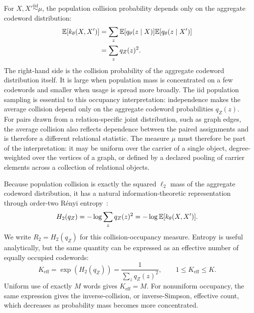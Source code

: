 For $X,X'\overset{\mathrm{iid}}{\sim}\mu$, the population collision probability depends only on the aggregate codeword distribution:
\begin{align}
\mathbb{E}[k_\theta(X,X')]
&=\sum_z\mathbb{E}[q_\theta(z\mid X)]\mathbb{E}[q_\theta(z\mid X')]\\
&=\sum_zq_Z(z)^2.
\label{eq:population-collision}
\end{align}
The right-hand side is the collision probability of the aggregate codeword distribution itself.
It is large when population mass is concentrated on a few codewords and smaller when usage is spread more broadly.
The iid population sampling is essential to this occupancy interpretation: independence makes the average collision depend only on the aggregate codeword probabilities $q_Z(z)$.
For pairs drawn from a relation-specific joint distribution, such as graph edges, the average collision also reflects dependence between the paired assignments and is therefore a different relational statistic.
The measure $\mu$ must therefore be part of the interpretation: it may be uniform over the carrier of a single object, degree-weighted over the vertices of a graph, or defined by a declared pooling of carrier elements across a collection of relational objects.

Because population collision is exactly the squared $\ell_2$ mass of the aggregate codeword distribution, it has a natural information-theoretic representation through order-two R\'enyi entropy~\citep{renyi1961measures}:
\begin{equation}
H_2(q_Z)=-\log\sum_zq_Z(z)^2
=-\log\mathbb{E}[k_\theta(X,X')].
\label{eq:collision-entropy}
\end{equation}
We write $R_2=H_2(q_Z)$ for this collision-occupancy measure.
Entropy is useful analytically, but the same quantity can be expressed as an effective number of equally occupied codewords:
\begin{equation}
K_{\mathrm{eff}}=\exp(H_2(q_Z))
=\frac{1}{\sum_zq_Z(z)^2},\qquad 1\le K_{\mathrm{eff}}\le K.
\label{eq:effective-code-count}
\end{equation}
Uniform use of exactly $M$ words gives $K_{\mathrm{eff}}=M$.
For nonuniform occupancy, the same expression gives the inverse-collision, or inverse-Simpson, effective count, which decreases as probability mass becomes more concentrated.


